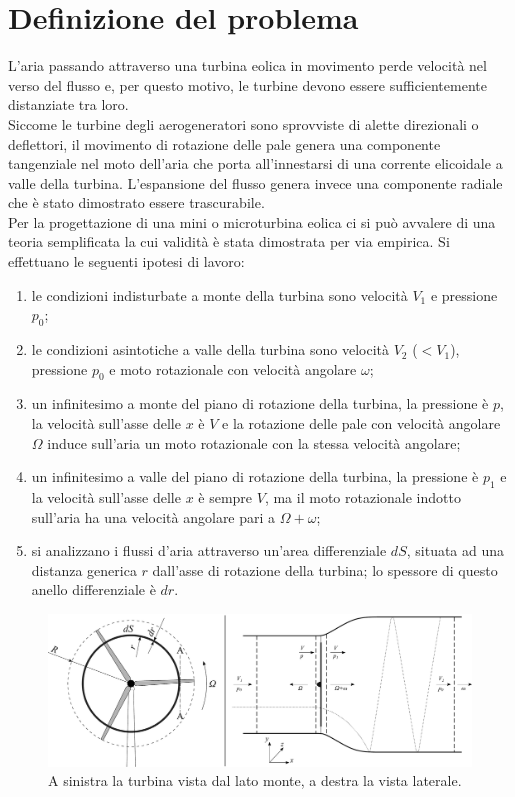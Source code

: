 \section{Definizione del problema}
L'aria passando attraverso una turbina eolica in movimento perde velocità nel verso del flusso e, per questo motivo, le turbine devono essere sufficientemente distanziate tra loro.\\
Siccome le turbine degli aerogeneratori sono sprovviste di alette direzionali o deflettori, il movimento di rotazione delle pale genera una componente tangenziale nel moto dell'aria che porta all'innestarsi di una corrente elicoidale a valle della turbina. L'espansione del flusso genera invece una componente radiale che è stato dimostrato essere trascurabile.\\
Per la progettazione di una mini o microturbina eolica ci si può avvalere di una teoria semplificata la cui validità è stata dimostrata per via empirica. Si effettuano le seguenti ipotesi di lavoro:
\begin{enumerate}
\item le condizioni indisturbate a monte della turbina sono velocità $V_1$ e pressione $p_0$;
\item le condizioni asintotiche a valle della turbina sono velocità $V_2$ ($<V_1$), pressione $p_0$ e moto rotazionale con velocità angolare $\omega$;
\item un infinitesimo a monte del piano di rotazione della turbina, la pressione è $p$, la velocità sull'asse delle $x$ è $V$ e la rotazione delle pale con velocità angolare $\Omega$ induce sull'aria un moto rotazionale con la stessa velocità angolare;
\item un infinitesimo a valle del piano di rotazione della turbina, la pressione è $p_1$ e la velocità sull'asse delle $x$ è sempre $V$, ma il moto rotazionale indotto sull'aria ha una velocità angolare pari a $\Omega+\omega$;
\item si analizzano i flussi d'aria attraverso un'area differenziale $dS$, situata ad una distanza generica $r$ dall'asse di rotazione della turbina; lo spessore di questo anello differenziale è $dr$.
\end{enumerate}
\begin{figure}
\centering
  \includegraphics[width=\textwidth]{fig/frontlatEol.pdf}
\caption{A sinistra la turbina vista dal lato monte, a destra la vista laterale.}
\label{fig:frontlatEol}
\end{figure}

